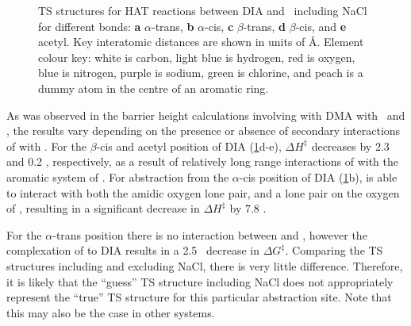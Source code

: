 \begin{doublespace}
\begin{figure}\ContinuedFloat
  \setcounter{subfigure}{4}

  \caption[TS structures for HAT reaction between DIA and \cumo\ including
  NaCl.]{TS structures for HAT reactions between DIA and \cumo\ including NaCl
  for different  bonds: \textbf{a} $\alpha$-trans, \textbf{b}
  $\alpha$-cis, \textbf{c} $\beta$-trans, \textbf{d} $\beta$-cis, and
  \textbf{e} acetyl. Key interatomic distances are shown in units of \AA.
  Element colour key: white is carbon, light blue is hydrogen, red is oxygen,
  blue is nitrogen, purple is sodium, green is chlorine, and peach is a dummy
  atom in the centre of an aromatic ring.}
  \label{fig:dia-cumo-ts}
\end{figure}

As was observed in the barrier height calculations involving  with DMA
with \bno\ and \cumo, the results vary depending on the presence or absence of
secondary interactions of  with \cumo. For the $\beta$-cis and acetyl
position of DIA (\ref{fig:dia-cumo-ts}d-e), $\Delta H^\ddagger$ decreases by 2.3
and 0.2 \kcalmol, respectively, as a result of relatively long range
interactions of  with the aromatic system of \cumo. For abstraction from
the $\alpha$-cis position of DIA (\ref{fig:dia-cumo-ts}b),  is able to
interact with both the amidic oxygen lone pair, and a lone pair on the oxygen of
\cumo, resulting in a significant decrease in $\Delta H^\ddagger$ by 7.8
\kcalmol.

For the $\alpha$-trans position there is no interaction between  and
\cumo, however the complexation of  to DIA results in a 2.5 \kcalmol\
decrease in $\Delta G^\ddagger$. Comparing the TS structures including and
excluding NaCl, there is very little difference. Therefore, it is likely that
the ``guess'' TS structure including NaCl does not appropriately represent the
``true'' TS structure for this particular abstraction site. Note that this may
also be the case in other systems.


\end{doublespace}
